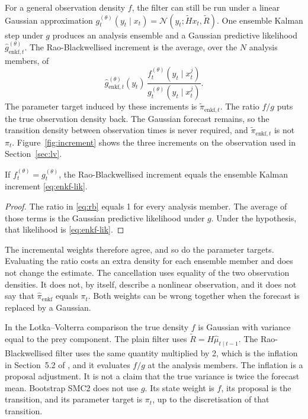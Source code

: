 For a general observation density \(f\), the filter can still be run under a linear Gaussian approximation \(g_t^{(\theta)}(y_t \mid x_t) = \mathcal{N}(y_t; \tilde{H} x_t, \tilde{R})\). One ensemble Kalman step under \(g\) produces an analysis ensemble and a Gaussian predictive likelihood \(\hat{g}_{\mathrm{enkf},t}^{(\theta)}\). The Rao-Blackwellised increment is the average, over the \(N\) analysis members, of
\begin{equation}
\label{eq:rb}
\hat{g}_{\mathrm{enkf},t}^{(\theta)}(y_t)\,
  \frac{f_t^{(\theta)}(y_t \mid x_t^{j})}{g_t^{(\theta)}(y_t \mid x_t^{j})}.
\end{equation}
The parameter target induced by these increments is \(\tilde{\pi}_{\mathrm{enkf},t}\). The ratio \(f/g\) puts the true observation density back. The Gaussian forecast remains, so the transition density between observation times is never required, and \(\tilde{\pi}_{\mathrm{enkf},t}\) is not \(\pi_t\). Figure~\ref{fig:increment} shows the three increments on the observation used in Section~\ref{sec:lv}.

\begin{lemma}
\label{lem:identity}
If \(f_t^{(\theta)} = g_t^{(\theta)}\), the Rao-Blackwellised increment equals the ensemble Kalman increment \eqref{eq:enkf-lik}.
\end{lemma}

\begin{proof}
The ratio in \eqref{eq:rb} equals 1 for every analysis member. The average of those terms is the Gaussian predictive likelihood under \(g\). Under the hypothesis, that likelihood is \eqref{eq:enkf-lik}.
\end{proof}

The incremental weights therefore agree, and so do the parameter targets. Evaluating the ratio costs an extra density for each ensemble member and does not change the estimate. The cancellation uses equality of the two observation densities. It does not, by itself, describe a nonlinear observation, and it does not say that \(\hat{\pi}_{\mathrm{enkf}}\) equals \(\pi_t\). Both weights can be wrong together when the forecast is replaced by a Gaussian.

In the Lotka--Volterra comparison the true density \(f\) is Gaussian with variance equal to the prey component. The plain filter uses \(\tilde{R} = H\hat{\mu}_{t\mid t-1}\). The Rao-Blackwellised filter uses the same quantity multiplied by 2, which is the inflation in Section~5.2 of \citet{golightly2026}, and it evaluates \(f/g\) at the analysis members. The inflation is a proposal adjustment. It is not a claim that the true variance is twice the forecast mean. Bootstrap SMC2 does not use \(g\). Its state weight is \(f\), its proposal is the transition, and its parameter target is \(\pi_t\), up to the discretisation of that transition.


